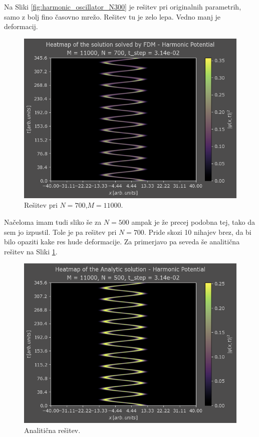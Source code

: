 \documentclass[a4paper]{article}
\begin{document}
Na Sliki \ref{fig:harmonic_oscillator_N300} je rešitev pri originalnih parametrih, samo z bolj fino časovno mrežo.
Rešitev tu je zelo lepa. Vedno manj je deformacij. 

\begin{figure}[p]
    \centering
    \includegraphics[width=\textwidth]{./images/case1_N700.png}
    \caption{Rešitev pri $N=700$,$M=11000$.}
\end{figure}

Načeloma imam tudi sliko še za $N=500$ ampak je že precej podobna tej, tako da sem jo izpustil.
Tole je pa rešitev pri $N=700$. Pride skozi 10 nihajev brez, da bi bilo opaziti kake res hude deformacije.
Za primerjavo pa seveda še analitična rešitev na Sliki \ref{fig:harmonic_oscillator_analytic}.

\begin{figure}[p]
    \centering
    \includegraphics[width=\textwidth]{./images/case1_analytic.png}
    \caption{Analitična rešitev.}
    \label{fig:harmonic_oscillator_analytic}
\end{figure}
\end{document}
